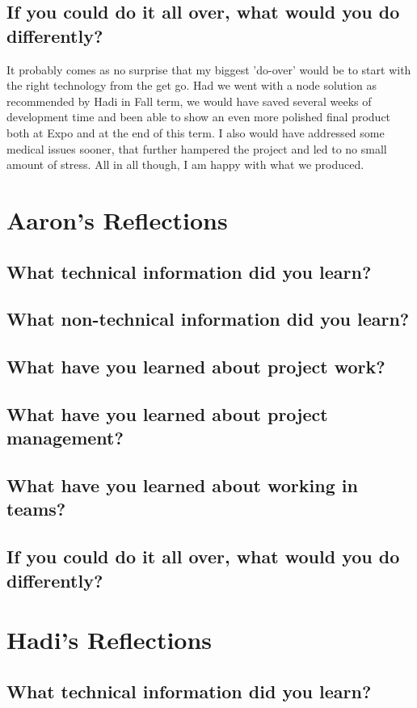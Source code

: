 \documentclass[onecolumn, draftclsnofoot,10pt, compsoc]{report}
\begin{document}
\subsection{If you could do it all over, what would you do differently?}
It probably comes as no surprise that my biggest 'do-over' would be to start with the right technology from the get go. Had we went with a node solution as recommended by Hadi in Fall term, we would have saved several weeks of development time and been able to show an even more polished final product both at Expo and at the end of this term. I also would have addressed some medical issues sooner, that further hampered the project and led to no small amount of stress. All in all though, I am happy with what we produced. 
\section{Aaron's Reflections}
\subsection{What technical information did you learn?}
\subsection{What non-technical information did you learn?}
\subsection{What have you learned about project work?}
\subsection{What have you learned about project management?}
\subsection{What have you learned about working in teams?}
\subsection{If you could do it all over, what would you do differently?}
\section{Hadi's Reflections}
\subsection{What technical information did you learn?}
\end{document}
